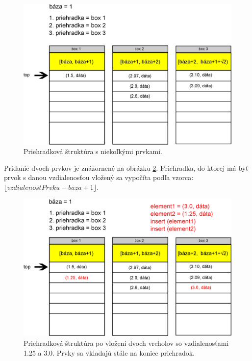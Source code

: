 \begin{figure}[h]
\centering
\includegraphics[width=\textwidth]{./img/priehradky_naplnene_default.eps}
\caption{Priehradková štruktúra s niekoľkými prvkami.}
\label{fig:priehradky}
\end{figure}

Pridanie dvoch prvkov je znázornené na obrázku \ref{fig:priehradky_i}. Priehradka, do ktorej má byť prvok s danou vzdialenosťou vložený sa vypočíta podľa vzorca:\\
 $ \lfloor vzdialenostPrvku - baza +1 \rfloor $.


\begin{figure}[h]
\centering
\includegraphics[width=\textwidth]{./img/priehradky_naplnene_default_i.eps}
\caption{Priehradková štruktúra po vložení dvoch vrcholov so vzdialenosťami 1.25 a 3.0. Prvky sa vkladajú stále na koniec priehradok.}
\label{fig:priehradky_i}
\end{figure}


